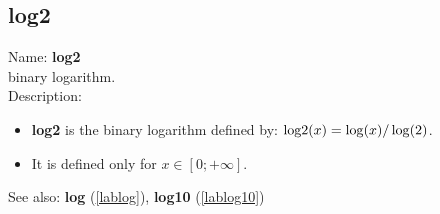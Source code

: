 \subsection{log2}
\label{lablog2}
\noindent Name: \textbf{log2}\\
binary logarithm.\\
\noindent Description: \begin{itemize}

\item \textbf{log2} is the binary logarithm defined by: ${\rm log2}(x) = \log(x)/\log(2)$.

\item It is defined only for $x \in [0; +\infty]$.
\end{itemize}
See also: \textbf{log} (\ref{lablog}), \textbf{log10} (\ref{lablog10})
